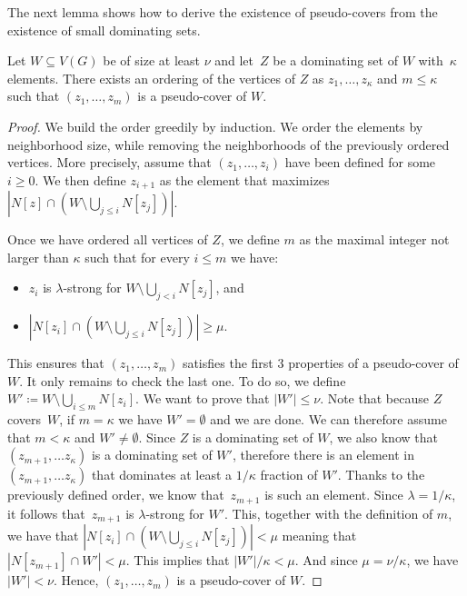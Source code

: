 The next lemma shows how to derive the existence of pseudo-covers from
the existence of small dominating sets.

\begin{lemma}\label{lem:cover-to-pseudo-cover}
  Let $W\subseteq V(G)$ be of size at least
  $\nu$ and let~$Z$ be a dominating set of $W$ with~$\kappa$ elements.
  There exists an ordering of the vertices of $Z$ as $z_1,\ldots, z_\kappa$
  and $m\leq \kappa$ such that $(z_1,\ldots, z_m)$ is a pseudo-cover of $W$.
\end{lemma}
\begin{proof}
  We build the order greedily by induction. We order the elements by neighborhood size, while removing the neighborhoods of the previously ordered vertices. More precisely, assume that $(z_1,\ldots,z_i)$ have been defined for \mbox{some~$i\ge 0$}. We then define $z_{i+1}$ as the element that maximizes $|N[z] \cap (W \setminus \bigcup_{j\le i}N[z_j])|$.

  Once we have ordered all vertices of $Z$, we define $m$ as the maximal integer not larger than $\kappa$ such that for every $i \le m$ we have:
  \begin{itemize}
    \item $z_i$ is $\lambda$-strong for $W\setminus\bigcup_{j<i}N[z_j]$, and
    \item $|N[z_i] \cap (W \setminus \bigcup_{j\le i}N[z_j])| \ge \mu$.
  \end{itemize}

  This ensures that $(z_1,\ldots, z_m)$ satisfies the first 3 properties of a
  pseudo-cover of $W$. It only remains to check the last one.
  To do so, we define $W' \coloneq W \setminus\bigcup_{i\le m}N[z_i]$. We want to prove
  that $|W'| \le \nu$. Note that because $Z$ covers~$W$, if $m=\kappa$ we
  have $W'=\emptyset$ and we are done. We can therefore assume
  that $m<\kappa$ and $W'\neq \emptyset$. Since $Z$ is a dominating set of $W$,
  we also know that $(z_{m+1},\ldots z_\kappa)$ is a dominating set of $W'$,
  therefore there is an element in $(z_{m+1},\ldots z_\kappa)$ that
  dominates at least a $1 / \kappa$ fraction of $W'$. Thanks to the
  previously defined order, we know that~$z_{m+1}$ is such an element.
  Since $\lambda = 1/\kappa$, it follows that~$z_{m+1}$ is $\lambda$-strong
  for $W'$.
  This, together with the definition of $m$, we have that $|N[z_i] \cap (W \setminus \bigcup_{j\le i}N[z_j])| < \mu$ meaning that $|N[z_{m+1}] \cap W'| < \mu$. This implies that $|W'|/\kappa < \mu$. And since $\mu = \nu/\kappa$, we have $|W'|<\nu$.
  Hence, $(z_1,\ldots, z_m)$ is a pseudo-cover of $W$.
\end{proof}

